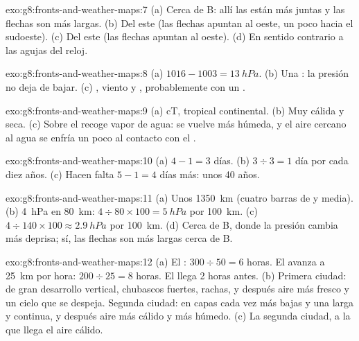 \begin{solution}{exo:g8:fronts-and-weather-maps:7}
(a) Cerca de B: allí las  están más juntas y las flechas son más
largas. (b) Del este (las flechas apuntan al oeste, un poco hacia el
sudoeste). (c) Del este (las flechas apuntan al oeste). (d) En sentido
contrario a las agujas del reloj.
\end{solution}

\begin{solution}{exo:g8:fronts-and-weather-maps:8}
(a) $1016 - 1003 = \qty{13}{hPa}$. (b) Una : la presión no deja de
bajar. (c) , viento y , probablemente con un .
\end{solution}

\begin{solution}{exo:g8:fronts-and-weather-maps:9}
(a) cT, tropical continental. (b) Muy cálida y seca. (c) Sobre el 
recoge vapor de agua: se vuelve más húmeda, y el aire cercano al agua se
enfría un poco al contacto con el .
\end{solution}

\begin{solution}{exo:g8:fronts-and-weather-maps:10}
(a) $4 - 1 = 3$ días. (b) $3 \div 3 = 1$ día por cada diez años. (c) Hacen
falta $5 - 1 = 4$ días más: unos 40 años.
\end{solution}

\begin{solution}{exo:g8:fronts-and-weather-maps:11}
(a) Unos \qty{1350}{km} (cuatro barras de  y media).
(b) \qty{4}{hPa} en \qty{80}{km}: $4 \div 80 \times 100 = \qty{5}{hPa}$ por
\qty{100}{km}. (c) $4 \div 140 \times 100 \approx \qty{2.9}{hPa}$ por
\qty{100}{km}. (d) Cerca de B, donde la presión cambia más deprisa; sí,
las flechas son más largas cerca de B.
\end{solution}

\begin{solution}{exo:g8:fronts-and-weather-maps:12}
(a) El : $300 \div 50 = 6$ horas. El  avanza a
\qty{25}{km} por hora: $200 \div 25 = 8$ horas. El  llega
2 horas antes. (b) Primera ciudad:  de gran desarrollo vertical,
chubascos fuertes, rachas, y después aire más fresco y un cielo que se
despeja. Segunda ciudad:  en capas cada vez más bajas y una 
larga y continua, y después aire más cálido y más húmedo. (c) La segunda
ciudad, a la que llega el aire cálido.
\end{solution}

